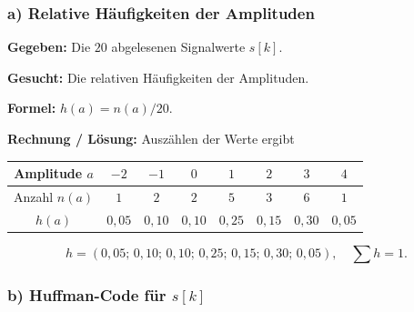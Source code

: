 \subsubsection*{a) Relative Häufigkeiten der Amplituden}

\begin{beispiel}

\textbf{Gegeben:} Die $20$ abgelesenen Signalwerte $s[k]$.

\textbf{Gesucht:} Die relativen Häufigkeiten der Amplituden.

\textbf{Formel:} $h(a) = n(a)/20$.

\textbf{Rechnung / Lösung:} Auszählen der Werte ergibt

\begin{center}
\begin{tabular}{c|ccccccc}
Amplitude $a$ & $-2$ & $-1$ & $0$ & $1$ & $2$ & $3$ & $4$ \\
\hline
Anzahl $n(a)$ & $1$ & $2$ & $2$ & $5$ & $3$ & $6$ & $1$ \\
$h(a)$ & $0{,}05$ & $0{,}10$ & $0{,}10$ & $0{,}25$ & $0{,}15$ & $0{,}30$ & $0{,}05$ \\
\end{tabular}
\end{center}

$$
\boxed{\;h = (0{,}05;\,0{,}10;\,0{,}10;\,0{,}25;\,0{,}15;\,0{,}30;\,0{,}05),
\quad \textstyle\sum h = 1.\;}
$$

\end{beispiel}

\subsubsection*{b) Huffman-Code für $s[k]$}

